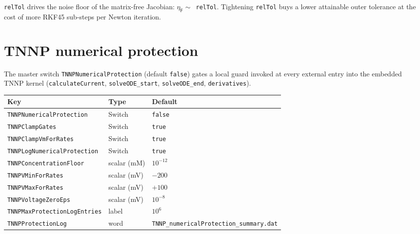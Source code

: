 \documentclass[11pt,a4paper]{article}
\newcommand{\code}[1]{\texttt{\small #1}}
\begin{document}
\code{relTol} drives the noise floor of the matrix-free Jacobian:
$\eta_{\mathsf{F}} \sim $~\code{relTol}. Tightening \code{relTol} buys
a lower attainable outer tolerance at the cost of more RKF45 sub-steps
per Newton iteration.

\section{TNNP numerical protection}

The master switch \code{TNNPNumericalProtection} (default \code{false})
gates a local guard invoked at every external entry into the embedded TNNP
kernel (\code{calculateCurrent}, \code{solveODE\_start},
\code{solveODE\_end}, \code{derivatives}).

\begin{center}
\begin{tabular}{@{}lll@{}}
\toprule
Key & Type & Default \\
\midrule
\code{TNNPNumericalProtection} & Switch & \code{false} \\
\code{TNNPClampGates} & Switch & \code{true} \\
\code{TNNPClampVmForRates} & Switch & \code{true} \\
\code{TNNPLogNumericalProtection} & Switch & \code{true} \\
\code{TNNPConcentrationFloor} & scalar (mM) & $10^{-12}$ \\
\code{TNNPVMinForRates} & scalar (mV) & $-200$ \\
\code{TNNPVMaxForRates} & scalar (mV) & $+100$ \\
\code{TNNPVoltageZeroEps} & scalar (mV) & $10^{-8}$ \\
\code{TNNPMaxProtectionLogEntries} & label & $10^{6}$ \\
\code{TNNPProtectionLog} & word & \code{TNNP\_numericalProtection\_summary.dat} \\
\bottomrule
\end{tabular}
\end{center}
\end{document}

